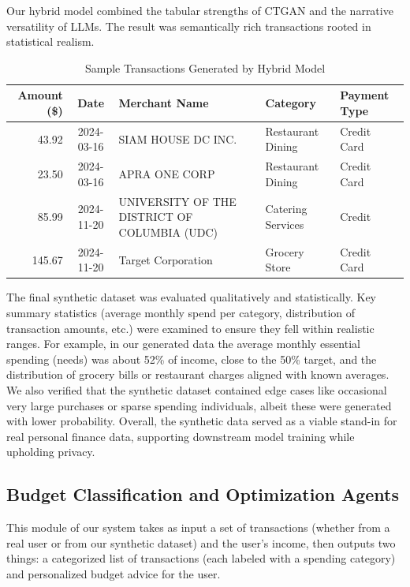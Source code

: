 \documentclass{scrartcl}
\begin{document}
Our hybrid model combined the tabular strengths of CTGAN and the narrative versatility of LLMs. The result was semantically rich transactions rooted in statistical realism.

\begin{table}[ht]
\centering
\small %
\caption{Sample Transactions Generated by Hybrid Model}
\label{tab:hybrid_transactions}
\begin{tabular}{|r|c|p{3.5cm}|p{3cm}|p{2.5cm}|}
\hline
\textbf{Amount (\$)} & \textbf{Date} & \textbf{Merchant Name} & \textbf{Category} & \textbf{Payment Type} \\
\hline
43.92 & 2024-03-16 & SIAM HOUSE DC INC. & Restaurant Dining & Credit Card \\
23.50 & 2024-03-16 & APRA ONE CORP & Restaurant Dining & Credit Card \\
85.99 & 2024-11-20 & UNIVERSITY OF THE DISTRICT OF COLUMBIA (UDC) & Catering Services & Credit \\
145.67 & 2024-11-20 & Target Corporation & Grocery Store & Credit Card \\
\hline
\end{tabular}
\end{table}

The final synthetic dataset was evaluated qualitatively and statistically. Key summary statistics (average monthly spend per category, distribution of transaction amounts, etc.) were examined to ensure they fell within realistic ranges. For example, in our generated data the average monthly essential spending (needs) was about 52\% of income, close to the 50\% target, and the distribution of grocery bills or restaurant charges aligned with known averages. We also verified that the synthetic dataset contained edge cases like occasional very large purchases or sparse spending individuals, albeit these were generated with lower probability. Overall, the synthetic data served as a viable stand-in for real personal finance data, supporting downstream model training while upholding privacy.

\subsection{Budget Classification and Optimization Agents}
This module of our system takes as input a set of transactions (whether from a real user or from our synthetic dataset) and the user's income, then outputs two things: a categorized list of transactions (each labeled with a spending category) and personalized budget advice for the user.
\end{document}
